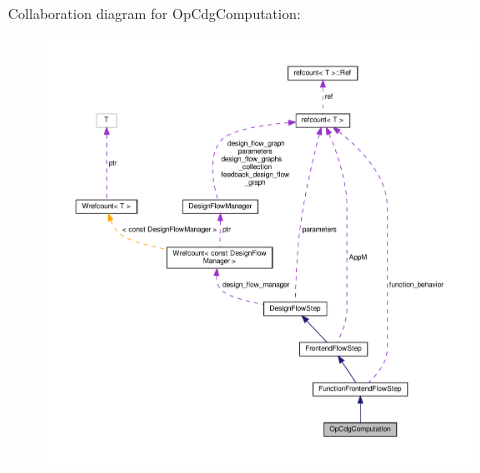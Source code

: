 Collaboration diagram for Op\+Cdg\+Computation\+:
\nopagebreak
\begin{figure}[H]
\begin{center}
\leavevmode
\includegraphics[width=350pt]{db/d7c/classOpCdgComputation__coll__graph}
\end{center}
\end{figure}
